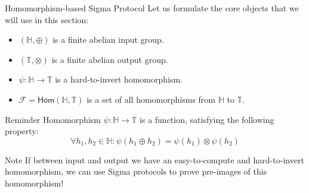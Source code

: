 \documentclass{zkdl-presentation-template}
\begin{document}
    \begin{frame}{Homomorphism-based Sigma Protocol}
        Let us formulate the core objects that we will use in this section:\pause
        \begin{itemize}
            \item $(\mathbb{H}, \oplus)$ is a finite abelian input group.\pause
            \item $(\mathbb{T}, \otimes)$ is a finite abelian output group.\pause
            \item $\psi: \mathbb{H} \to \mathbb{T}$ is a hard-to-invert homomorphism.\pause
            \item $\mathcal{F} = \mathsf{Hom}(\mathbb{H}, \mathbb{T})$ is a set of all homomorphisms from $\mathbb{H}$ to $\mathbb{T}$.\pause
        \end{itemize}

        \begin{remarkblock}{Reminder}
            Homomorphism $\psi: \mathbb{H} \to \mathbb{T}$ is a function, satisfying the following property:
            \begin{equation*}
                \forall h_1, h_2 \in \mathbb{H}: \psi(h_1 \oplus h_2) = \psi(h_1) \otimes \psi(h_2)
            \end{equation*}
        \end{remarkblock}
        \pause

        \begin{remarkblock}{Note}
            If between input and output we have an easy-to-compute and hard-to-invert homomorphism, we can use Sigma protocols to prove pre-images of this homomorphism!
        \end{remarkblock}
    \end{frame}
\end{document}
